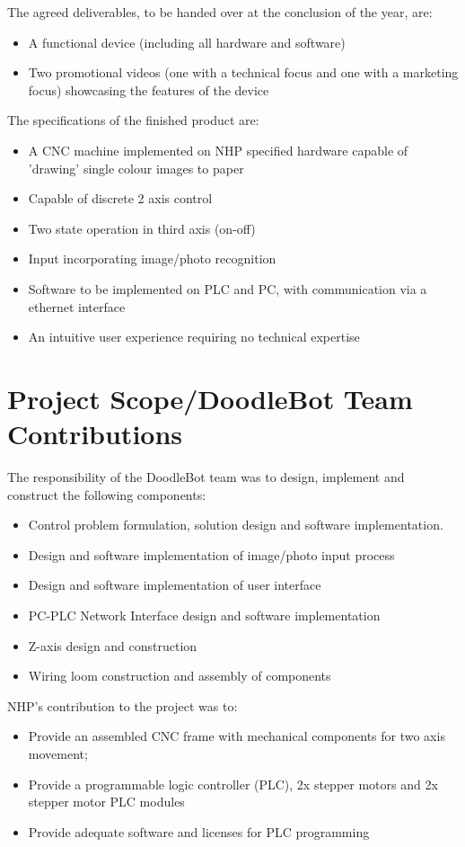 The agreed deliverables, to be handed over at the conclusion of the year, are:
	\begin{itemize}
		\item A functional device (including all hardware and software)
		\item Two promotional videos (one with a technical focus and one with a marketing focus) showcasing the features of the device
	\end{itemize}	

The specifications of the finished product are:
	\begin{itemize}
		\item A CNC machine implemented on NHP specified hardware capable of 'drawing' single colour images to paper
		\item Capable of discrete 2 axis control
		\item Two state operation in third axis (on-off)
		\item Input incorporating image/photo recognition
		\item Software to be implemented on PLC and PC, with communication via a ethernet interface
		\item An intuitive user experience requiring no technical expertise
	\end{itemize}

\section{Project Scope/DoodleBot Team Contributions}
The responsibility of the DoodleBot team was to design, implement and construct the following components:
	\begin{itemize}
		\item Control problem formulation, solution design and software implementation. 
		\item Design and software implementation of image/photo input process
		\item Design and software implementation of user interface
		\item PC-PLC Network Interface design and software implementation
		\item Z-axis design and construction
		\item Wiring loom construction and assembly of components
	\end{itemize}
	
NHP's contribution to the project was to:
	\begin{itemize}
		\item Provide an assembled CNC frame with mechanical components for two axis movement;
		\item Provide a programmable logic controller (PLC), 2x stepper motors and 2x stepper motor PLC modules
		\item Provide adequate software and licenses for PLC programming
	\end{itemize}


